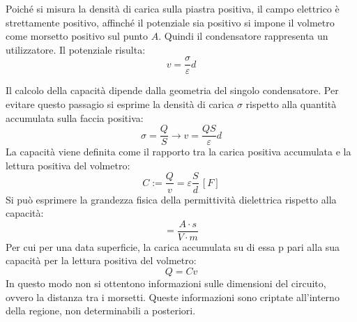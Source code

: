 \documentclass{article}
\numberwithin{equation}{subsection}
\begin{document}
Poiché si misura la densità di carica sulla piastra positiva, il campo elettrico è strettamente positivo, affinché il potenziale sia positivo si impone il volmetro come 
morsetto positivo sul punto $A$. Quindi il condensatore rappresenta un utilizzatore. Il potenziale risulta:
\begin{equation*}
    v=\displaystyle\frac{\sigma}{\varepsilon}d
\end{equation*}

Il calcolo della capacità dipende dalla geometria del singolo condensatore. Per evitare questo passagio si esprime la densità di carica $\sigma$ rispetto alla quantità 
accumulata sulla faccia positiva:
\begin{equation*}
    \sigma=\displaystyle\frac{Q}{S}\to v=\frac{QS}{\varepsilon}d
\end{equation*}
La capacità viene definita come il rapporto tra la carica positiva accumulata e la lettura positiva del volmetro:
\begin{equation}
    C:=\displaystyle\frac{Q}{v}=\varepsilon\frac{S}{d}\,[F]
\end{equation}
Si può esprimere la grandezza fisica della permittività dielettrica rispetto alla capacità:
\begin{equation*}
    [\varepsilon]=\displaystyle\frac{A\cdot s}{V\cdot m}
\end{equation*} 
Per cui per una data superficie, la carica accumulata su di essa p pari alla sua capacità per la lettura positiva del volmetro:
\begin{equation*}
    Q=Cv
\end{equation*}
In questo modo non si ottentono informazioni sulle dimensioni del circuito, ovvero la distanza tra i morsetti. Queste informazioni sono criptate all'interno della regione, 
non determinabili a posteriori. 
\end{document}
